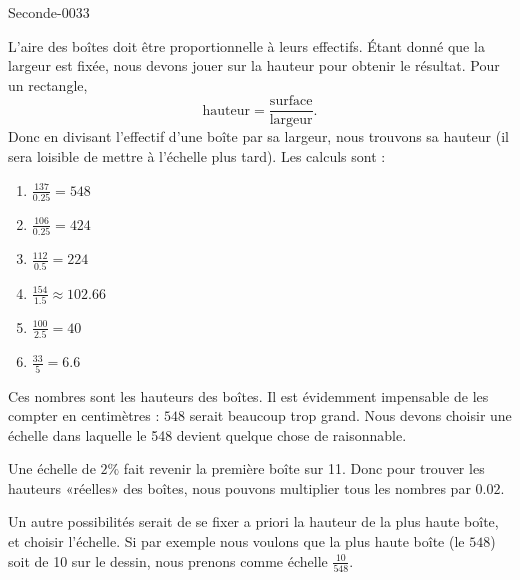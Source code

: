 
\begin{corrige}{Seconde-0033}

    L'aire des boîtes doit être proportionnelle à leurs effectifs. Étant donné que la largeur est fixée, nous devons jouer sur la hauteur pour obtenir le résultat. Pour un rectangle,
    \begin{equation}
        \text{hauteur}=\frac{ \text{surface} }{ \text{largeur} }.
    \end{equation}
    Donc en divisant l'effectif d'une boîte par sa largeur, nous trouvons sa hauteur (il sera loisible de mettre à l'échelle plus tard). Les calculs sont :
    \begin{enumerate}
        \item
            \( \frac{ 137 }{ 0.25 }=548\)
        \item
            \( \frac{ 106 }{ 0.25 }=424\)
        \item
            \( \frac{ 112 }{ 0.5 }=224\)
        \item
            \( \frac{ 154 }{ 1.5 }\approx 102.66\)
        \item
            \( \frac{ 100 }{ 2.5 }=40\)
        \item
            \( \frac{ 33 }{ 5 }=6.6\)
    \end{enumerate}
    Ces nombres sont les hauteurs des boîtes. Il est évidemment impensable de les compter en centimètres : \( 548\) serait beaucoup trop grand. Nous devons choisir une échelle dans laquelle le 548 devient quelque chose de raisonnable.

    Une échelle de \( 2\%\) fait revenir la première boîte sur \unit{11}{\centi\meter}. Donc pour trouver les hauteurs «réelles» des boîtes, nous pouvons multiplier tous les nombres par \( 0.02\).

    Un autre possibilités serait de se fixer a priori la hauteur de la plus haute boîte, et choisir l'échelle. Si par exemple nous voulons que la plus haute boîte (le \( 548\)) soit de \unit{10}{\centi\meter} sur le dessin, nous prenons comme échelle \( \frac{ 10 }{ 548 }\).


\end{corrige}
